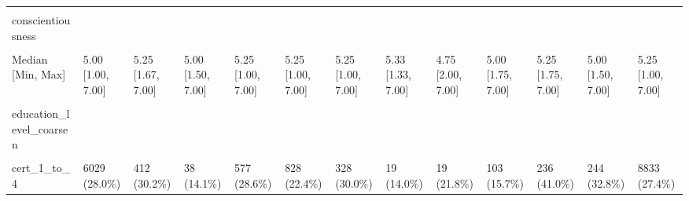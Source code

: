 \documentclass[
  single column]{article}
\begin{document}
\begin{landscape}
\begin{longtable}[t]{lllllllllllll}
\cellcolor{gray!10}{Missing} & \cellcolor{gray!10}{25 (0.1\%)} & \cellcolor{gray!10}{2 (0.1\%)} & \cellcolor{gray!10}{1 (0.4\%)} & \cellcolor{gray!10}{1 (0.0\%)} & \cellcolor{gray!10}{10 (0.3\%)} & \cellcolor{gray!10}{0 (0\%)} & \cellcolor{gray!10}{0 (0\%)} & \cellcolor{gray!10}{0 (0\%)} & \cellcolor{gray!10}{37 (5.6\%)} & \cellcolor{gray!10}{1 (0.2\%)} & \cellcolor{gray!10}{2 (0.3\%)} & \cellcolor{gray!10}{79 (0.2\%)}\\
\addlinespace
conscientiousness &  &  &  &  &  &  &  &  &  &  &  & \\
\cellcolor{gray!10}{Mean (SD)} & \cellcolor{gray!10}{5.01 (1.11)} & \cellcolor{gray!10}{5.21 (1.01)} & \cellcolor{gray!10}{5.06 (1.11)} & \cellcolor{gray!10}{5.22 (1.07)} & \cellcolor{gray!10}{5.09 (1.04)} & \cellcolor{gray!10}{5.09 (1.04)} & \cellcolor{gray!10}{5.25 (1.02)} & \cellcolor{gray!10}{4.91 (1.16)} & \cellcolor{gray!10}{5.02 (1.08)} & \cellcolor{gray!10}{5.15 (1.01)} & \cellcolor{gray!10}{4.91 (1.17)} & \cellcolor{gray!10}{5.05 (1.09)}\\
Median [Min, Max] & 5.00 [1.00, 7.00] & 5.25 [1.67, 7.00] & 5.00 [1.50, 7.00] & 5.25 [1.00, 7.00] & 5.25 [1.00, 7.00] & 5.25 [1.00, 7.00] & 5.33 [1.33, 7.00] & 4.75 [2.00, 7.00] & 5.00 [1.75, 7.00] & 5.25 [1.75, 7.00] & 5.00 [1.50, 7.00] & 5.25 [1.00, 7.00]\\
\cellcolor{gray!10}{Missing} & \cellcolor{gray!10}{66 (0.3\%)} & \cellcolor{gray!10}{3 (0.2\%)} & \cellcolor{gray!10}{0 (0\%)} & \cellcolor{gray!10}{7 (0.3\%)} & \cellcolor{gray!10}{18 (0.5\%)} & \cellcolor{gray!10}{1 (0.1\%)} & \cellcolor{gray!10}{0 (0\%)} & \cellcolor{gray!10}{0 (0\%)} & \cellcolor{gray!10}{3 (0.5\%)} & \cellcolor{gray!10}{4 (0.7\%)} & \cellcolor{gray!10}{4 (0.5\%)} & \cellcolor{gray!10}{106 (0.3\%)}\\
education\_level\_coarsen &  &  &  &  &  &  &  &  &  &  &  & \\
\addlinespace
\cellcolor{gray!10}{no\_qualification} & \cellcolor{gray!10}{322 (1.5\%)} & \cellcolor{gray!10}{15 (1.1\%)} & \cellcolor{gray!10}{1 (0.4\%)} & \cellcolor{gray!10}{24 (1.2\%)} & \cellcolor{gray!10}{41 (1.1\%)} & \cellcolor{gray!10}{30 (2.7\%)} & \cellcolor{gray!10}{0 (0\%)} & \cellcolor{gray!10}{2 (2.3\%)} & \cellcolor{gray!10}{26 (4.0\%)} & \cellcolor{gray!10}{8 (1.4\%)} & \cellcolor{gray!10}{23 (3.1\%)} & \cellcolor{gray!10}{492 (1.5\%)}\\
cert\_1\_to\_4 & 6029 (28.0\%) & 412 (30.2\%) & 38 (14.1\%) & 577 (28.6\%) & 828 (22.4\%) & 328 (30.0\%) & 19 (14.0\%) & 19 (21.8\%) & 103 (15.7\%) & 236 (41.0\%) & 244 (32.8\%) & 8833 (27.4\%)\\

\end{longtable}
\end{landscape}
\end{document}
